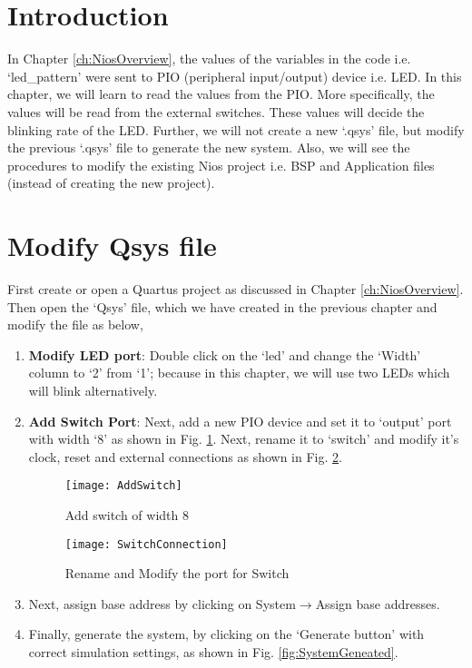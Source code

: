 \section{Introduction}
In Chapter \ref{ch:NiosOverview}, the values of the variables in the code i.e. `led\_pattern' were sent to PIO (peripheral input/output) device  i.e. LED. In this chapter, we will learn to read the values from the PIO. More specifically, the values will be read from the external switches. These values will decide the blinking rate of the LED. Further, we will not create a new `.qsys' file, but modify the previous `.qsys' file to generate the new system. Also, we will see the procedures to modify the existing Nios project i.e. BSP and Application files (instead of creating the new project). 

\section{Modify Qsys file}\label{sec:ModifyQysFile}
First create or open a Quartus project as discussed in Chapter \ref{ch:NiosOverview}. Then open the `Qsys' file, which we have created in the previous chapter and modify the file as below, 
\begin{enumerate}
	\item \textbf{Modify LED port}: Double click on the `led' and change the `Width' column to `2' from `1'; because in this chapter, we will use two LEDs which will blink alternatively. 
	\item \textbf{Add Switch Port}: Next, add a new PIO device and set it to `output' port with width `8' as shown in Fig. \ref{fig:AddSwitch}. Next, rename it to `switch' and modify it's clock, reset and external connections as shown in Fig. \ref{fig:SwitchConnection}. 
	
	\begin{figure}[!h]
		\centering
		\texttt{[image: AddSwitch]}
		\caption{Add switch of width 8}
		\label{fig:AddSwitch}
	\end{figure}
	\begin{figure}[!h]
		\centering
		\texttt{[image: SwitchConnection]}
		\caption{Rename and Modify the port for Switch}
		\label{fig:SwitchConnection}
	\end{figure}
	\item Next, assign base address by clicking on System$\rightarrow$Assign base addresses. 
	\item Finally, generate the system, by clicking on the `Generate button' with correct simulation settings, as shown in Fig. \ref{fig:SystemGeneated}.
\end{enumerate} 

